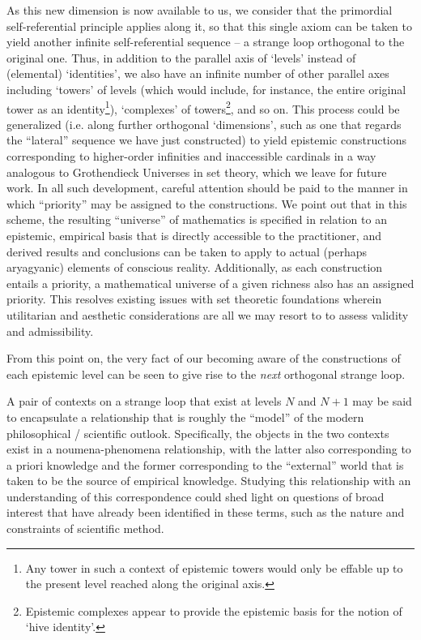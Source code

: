 \documentclass[pra,twocolumn,groupedaddress,10pt]{revtex4}
\theoremstyle{definition}
\begin{document}
\begin{enumerate}[label={[\textbf{\arabic*}]},start=0]
		As this new dimension is now available to us, we consider that the primordial self-referential principle applies along it, so that this single axiom can be taken to yield another infinite self-referential sequence -- a strange loop orthogonal to the original one. Thus, in addition to the parallel axis of `levels' instead of (elemental) `identities', we also have an infinite number of other parallel axes including `towers' of levels (which would include, for instance, the entire original tower as an identity\footnote{Any tower in such a context of epistemic towers would only be effable up to the present level reached along the original axis.}), `complexes' of towers\footnote{Epistemic complexes appear to provide the epistemic basis for the notion of `hive identity'.}, and so on. This process could be generalized (i.e. along further orthogonal `dimensions', such as one that regards the ``lateral'' sequence we have just constructed) to yield epistemic constructions corresponding to higher-order infinities and inaccessible cardinals in a way analogous to Grothendieck Universes in set theory, which we leave for future work. In all such development, careful attention should be paid to the manner in which ``priority'' may be assigned to the constructions. We point out that in this scheme, the resulting ``universe'' of mathematics is specified in relation to an epistemic, empirical basis that is directly accessible to the practitioner, and derived results and conclusions can be taken to apply to actual (perhaps aryagyanic) elements of conscious reality. Additionally, as each construction entails a priority, a mathematical universe of a given richness also has an assigned priority. This resolves existing issues with set theoretic foundations wherein utilitarian and aesthetic considerations are all we may resort to to assess validity and admissibility.

		From this point on, the very fact of our becoming aware of the constructions of each epistemic level can be seen to give rise to the \emph{next} orthogonal strange loop.

		A pair of contexts on a strange loop that exist at levels $N$ and $N + 1$ may be said to encapsulate a relationship that is roughly the ``model'' of the modern philosophical / scientific outlook. Specifically, the objects in the two contexts exist in a noumena-phenomena relationship, with the latter also corresponding to a priori knowledge and the former corresponding to the ``external'' world that is taken to be the source of empirical knowledge. Studying this relationship with an understanding of this correspondence could shed light on questions of broad interest that have already been identified in these terms, such as the nature and constraints of scientific method.


\end{enumerate}
\end{document}
